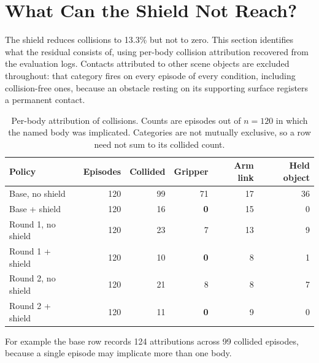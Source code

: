 \documentclass[a4paper,11pt]{report}
\begin{document}
\section{What Can the Shield Not Reach?}\label{sec:res:scope}

The shield reduces collisions to 13.3\% but not to zero. This section identifies what the residual
consists of, using per-body collision attribution recovered from the evaluation logs. Contacts
attributed to other scene objects are excluded throughout: that category fires on every episode of
every condition, including collision-free ones, because an obstacle resting on its supporting
surface registers a permanent contact.

\begin{table}[htbp]
\centering
\begin{threeparttable}
\caption[Residual collisions by culprit body]{%
  Per-body attribution of collisions. Counts are episodes out of $n = 120$ in which the named body
  was implicated. Categories are not mutually exclusive, so a row need not sum to its collided
  count.}
\label{tab:culprits}
\begin{tabular}{lrrrrr}
\toprule
\textbf{Policy} & \textbf{Episodes} & \textbf{Collided} & \textbf{Gripper} & \textbf{Arm link}
  & \textbf{Held object} \\
\midrule
Base, no shield        & 120 & 99 & 71          & 17 & 36 \\
Base + shield          & 120 & 16 & \textbf{0}  & 15 & \phantom{0}0 \\
\addlinespace[2pt]
Round 1, no shield     & 120 & 23 & \phantom{0}7 & 13 & \phantom{0}9 \\
Round 1 + shield       & 120 & 10 & \textbf{0}  & \phantom{0}8 & \phantom{0}1 \\
\addlinespace[2pt]
Round 2, no shield     & 120 & 21 & \phantom{0}8 & \phantom{0}8 & \phantom{0}7 \\
Round 2 + shield       & 120 & 11 & \textbf{0}  & \phantom{0}9 & \phantom{0}0 \\
\bottomrule
\end{tabular}
\begin{tablenotes}[flushleft]\footnotesize
\item[a] For example the base row records 124 attributions across 99 collided episodes, because a
  single episode may implicate more than one body.
\end{tablenotes}
\end{threeparttable}
\end{table}
\end{document}
